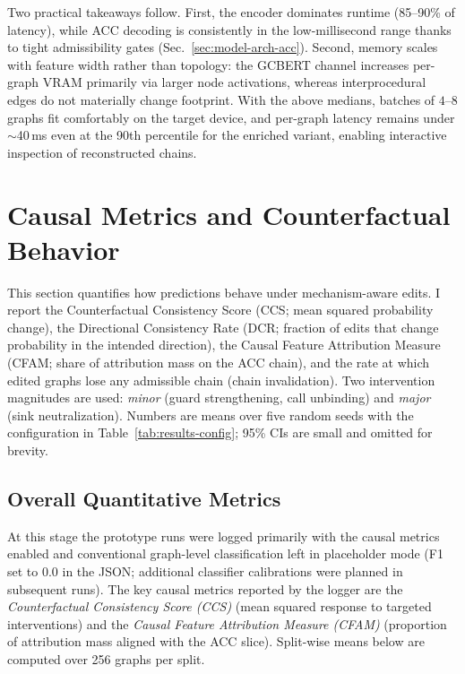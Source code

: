 \documentclass{buthesis}
\begin{document}
Two practical takeaways follow. First, the encoder dominates runtime (85–90\% of latency), while ACC decoding is consistently in the low-millisecond range thanks to tight admissibility gates (Sec.~\ref{sec:model-arch-acc}). Second, memory scales with feature width rather than topology: the GCBERT channel increases per-graph VRAM primarily via larger node activations, whereas interprocedural edges do not materially change footprint. With the above medians, batches of $4$–$8$ graphs fit comfortably on the target device, and per-graph latency remains under $\sim$40\,ms even at the 90th percentile for the enriched variant, enabling interactive inspection of reconstructed chains.


\section{Causal Metrics and Counterfactual Behavior}
\label{sec:results-causal-final}



This section quantifies how predictions behave under mechanism-aware edits. I report the Counterfactual Consistency Score (CCS; mean squared probability change), the Directional Consistency Rate (DCR; fraction of edits that change probability in the intended direction), the Causal Feature Attribution Measure (CFAM; share of attribution mass on the ACC chain), and the rate at which edited graphs lose any admissible chain (chain invalidation). Two intervention magnitudes are used: \emph{minor} (guard strengthening, call unbinding) and \emph{major} (sink neutralization). Numbers are means over five random seeds with the configuration in Table~\ref{tab:results-config}; 95\% CIs are small
and omitted for brevity.

\subsection{Overall Quantitative Metrics}
\label{subsec:results-quant-proto}

At this stage the prototype runs were logged primarily with the causal metrics enabled and conventional graph-level classification left in placeholder mode (F1 set to $0.0$ in the JSON; additional classifier calibrations were planned in subsequent runs). The key causal metrics reported by the logger are the \emph{Counterfactual Consistency Score (CCS)} (mean squared response to targeted interventions) and the \emph{Causal Feature Attribution Measure (CFAM)} (proportion of attribution mass aligned with the ACC slice). Split-wise means below are computed over 256 graphs per split.
\end{document}
